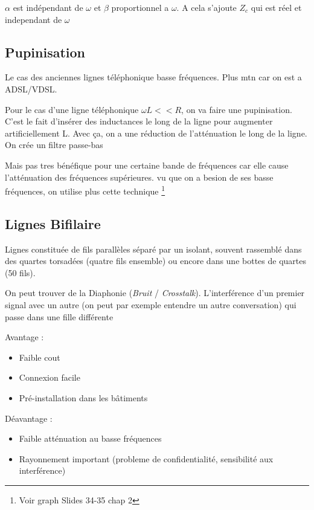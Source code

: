 \documentclass[12pt]{article}
\begin{document}
			$\alpha$ est indépendant de $\omega$ et $\beta$ proportionnel a $\omega$. A cela s'ajoute $Z_c$ qui est réel et independant de $\omega$
			
	\newpage
			
	\subsection{Pupinisation}
	
		Le cas des anciennes lignes téléphonique basse fréquences. Plus mtn car on est a ADSL/VDSL.
		
		Pour le cas d'une ligne téléphonique $\omega L << R$, on va faire une pupinisation. C'est le fait d'insérer des inductances le long de la ligne pour augmenter artificiellement L. Avec ça, on a une réduction de l'atténuation le long de la ligne. On crée un filtre passe-bas
		
		Mais pas tres bénéfique pour une certaine bande de fréquences car elle cause l'atténuation des fréquences supérieures. vu que on a besion de ses basse fréquences, on utilise plus cette technique \footnote{Voir graph Slides 34-35 chap 2}
		
	\subsection{Lignes Bifilaire}
	
		Lignes constituée de fils parallèles séparé par un isolant, souvent rassemblé dans des quartes torsadées (quatre fils ensemble) ou encore dans une bottes de quartes (50 fils).
		
		On peut trouver de la Diaphonie (\textit{Bruit} / \textit{Crosstalk}). L'interférence d'un premier signal avec un autre (on peut par exemple entendre un autre conversation) qui passe dans une fille différente
		
		Avantage :
		\begin{itemize}
			\item Faible cout
			\item Connexion facile
			\item Pré-installation dans les bâtiments
		\end{itemize}
		
		Déavantage :
		\begin{itemize}
			\item Faible atténuation au basse fréquences
			\item Rayonnement important (probleme de confidentialité, sensibilité aux interférence)

		\end{itemize}
\end{document}
